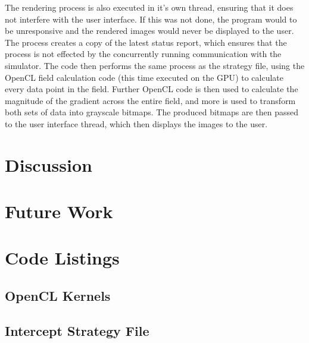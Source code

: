 \documentclass[10pt,british,english]{article}
\begin{document}
The rendering process is also executed in it's own thread, ensuring that it does not interfere with the user interface. If this was not done, the program would to be unresponsive and the rendered images would never be displayed to the user. The process creates a copy of the latest status report, which ensures that the process is not effected by the concurrently running communication with the simulator. The code then performs the same process as the strategy file, using the OpenCL field calculation code (this time executed on the \ac{GPU}) to calculate every data point in the field. Further OpenCL code is then used to calculate the magnitude of the gradient across the entire field, and more is used to transform both sets of data into grayscale bitmaps. The produced bitmaps are then passed to the user interface thread, which then displays the images to the user.

\section{Discussion}

\section{Future Work}

\appendix
\cleardoublepage{}

\section{Code Listings \label{sec:Code-Listings}}

\subsection{OpenCL Kernels\label{sub:OpenCL-Kernels}}

\subsection{Intercept Strategy File}

\cleardoublepage{}



\end{document}
